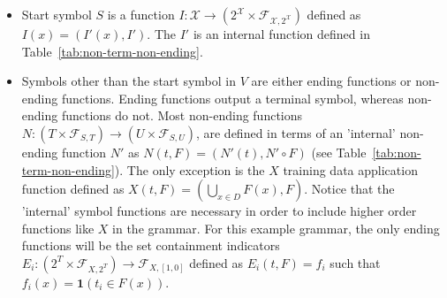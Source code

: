 \documentclass[11pt,letterpaper]{article}
\begin{document}
\begin{itemize}
\item Start symbol $S$ is a function 
$I:\mathcal{X}\rightarrow (2^{\mathcal{X}}\times \mathcal{F}_{\mathcal{X},2^{\mathcal{X}}})$
defined as $I(x)=(I'(x), I')$.  The $I'$ is an internal function defined in 
Table~\ref{tab:non-term-non-ending}.  

\item Symbols other than the start symbol in $V$ are either ending 
functions or non-ending functions. Ending functions output a terminal
symbol, whereas non-ending functions do not. Most non-ending functions
$N:(T\times \mathcal{F}_{S,T})\rightarrow (U\times \mathcal{F}_{S,U})$, 
are defined in terms of an 'internal' non-ending function $N'$ as 
$N(t,F)=(N'(t),N'\circ F)$ (see 
Table~\ref{tab:non-term-non-ending}).  The only exception is the 
$X$ training data application function defined as $X(t,F)=(\bigcup_{x\in D} F(x),F)$.  Notice that the
'internal' symbol functions are necessary in order to
include higher order functions like $X$ in the grammar.
For this example grammar, the only ending functions will be the set
containment indicators
$E_i:(2^T\times \mathcal{F}_{X,2^T})\rightarrow \mathcal{F}_{X,[1,0]}$ defined
as $E_i(t,F)=f_i$ such that $f_i(x)=\mathbf{1}(t_i\in F(x))$.  

\end{itemize}
\end{document}
